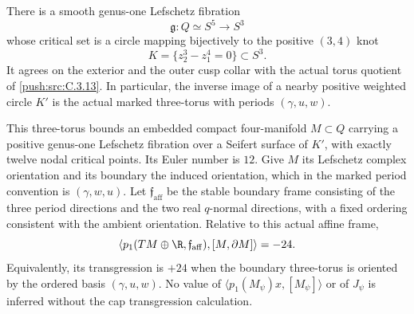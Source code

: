 \begin{proposition}\label{push:src:C.3.18}
There is a smooth genus-one Lefschetz fibration
\[
 \mathfrak g:Q\simeq S^5\longrightarrow S^3
\]
whose critical set is a circle mapping bijectively to the positive
$(3,4)$ knot
\[
 K=\{z_2^3-z_1^4=0\}\subset S^3.
\]
It agrees on the exterior and the outer cusp collar with the
actual torus quotient of \ref{push:src:C.3.13}. In particular, the inverse image
of a nearby positive weighted circle $K'$ is the actual marked
three-torus with periods $(\gamma,u,w)$.

This three-torus bounds an embedded compact four-manifold
$M\subset Q$ carrying a positive genus-one Lefschetz fibration
over a Seifert surface of $K'$, with exactly twelve nodal critical
points. Its Euler number is $12$. Give $M$ its Lefschetz complex
orientation and its boundary the induced orientation, which in
the marked period convention is $(\gamma,w,u)$. Let
$\mathfrak f_{\mathrm{aff}}$ be the stable boundary frame consisting
of the three period directions and the two real $q$-normal
directions, with a fixed ordering consistent with the ambient
orientation. Relative to this actual affine frame,
\[
 \left\langle p_1(TM\oplus\R,\mathfrak f_{\mathrm{aff}}),
                   [M,\partial M]\right\rangle=-24.
\]
Equivalently, its transgression is $+24$ when the boundary
three-torus is oriented by the ordered basis $(\gamma,u,w)$.
No value of $\langle p_1(M_\psi)x,[M_\psi]\rangle$ or of
$J_\psi$ is inferred without the cap transgression calculation.
\end{proposition}
